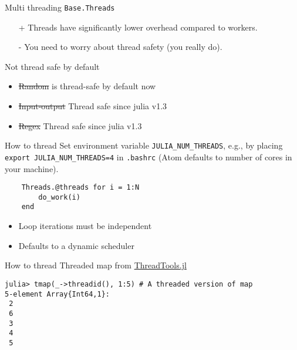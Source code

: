 \documentclass[10pt]{beamer}
\begin{document}
\begin{frame}{Multi threading}{}
    \texttt{Base.Threads}
    \begin{itemize}
        \item[+] Threads have significantly lower overhead compared to workers.
        \item[-] You need to worry about thread safety (you really do).
    \end{itemize}
\end{frame}

\begin{frame}{Not thread safe by default}{}
    \begin{itemize}
        \item \sout{Random} is thread-safe by default now
        \item \sout{Input-output} Thread safe since julia v1.3
        \item \sout{Regex} Thread safe since julia v1.3
    \end{itemize}
\end{frame}

\begin{frame}[fragile]{How to thread}{}
    Set environment variable \texttt{JULIA\_NUM\_THREADS}, e.g., by placing \texttt{export JULIA\_NUM\_THREADS=4} in \texttt{.bashrc} (Atom defaults to number of cores in your machine).

    \begin{verbatim}
    Threads.@threads for i = 1:N
        do_work(i)
    end
    \end{verbatim}

    \begin{itemize}
        \item Loop iterations must be independent
        \item Defaults to a dynamic scheduler
    \end{itemize}
\end{frame}

\begin{frame}[fragile]{How to thread}{}
    Threaded map from \href{https://github.com/baggepinnen/ThreadTools.jl}{ThreadTools.jl}
    \begin{verbatim}
julia> tmap(_->threadid(), 1:5) # A threaded version of map
5-element Array{Int64,1}:
 2
 6
 3
 4
 5
    \end{verbatim}


\end{frame}
\end{document}
